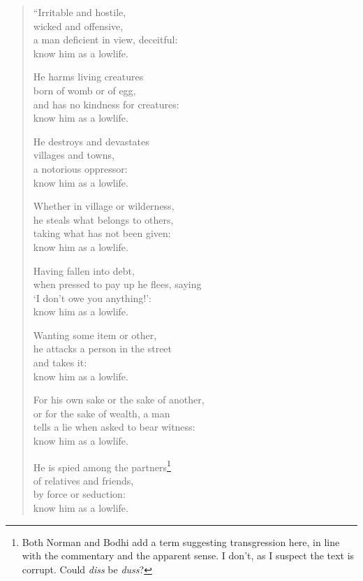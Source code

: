 \documentclass[12pt,openany]{book}%
\begin{document}
\begin{verse}%
“Irritable and hostile, \\
wicked and offensive, \\
a man deficient in view, deceitful: \\
know him as a lowlife. 

He harms living creatures \\
born of womb or of egg, \\
and has no kindness for creatures: \\
know him as a lowlife. 

He destroys and devastates \\
villages and towns, \\
a notorious oppressor: \\
know him as a lowlife. 

Whether in village or wilderness, \\
he steals what belongs to others, \\
taking what has not been given: \\
know him as a lowlife. 

Having fallen into debt, \\
when pressed to pay up he flees, saying \\
‘I don’t owe you anything!’: \\
know him as a lowlife. 

Wanting some item or other, \\
he attacks a person in the street \\
and takes it: \\
know him as a lowlife. 

For his own sake or the sake of another, \\
or for the sake of wealth, a man \\
tells a lie when asked to bear witness: \\
know him as a lowlife. 

He is spied among the partners\footnote{Both Norman and Bodhi add a term suggesting transgression here, in line with the commentary and the apparent sense. I don’t, as I suspect the text is corrupt. Could \textit{diss} be \textit{duss}? } \\
of relatives and friends, \\
by force or seduction: \\
know him as a lowlife. 


\end{verse}
\end{document}

